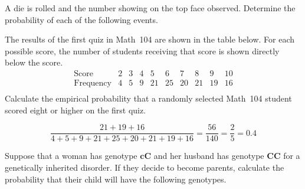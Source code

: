 \documentclass[addpoints,12pt]{exam}
\begin{document}
\begin{questions}

\question[15] A die is rolled and the number
showing on the top face observed. Determine the probability
of each of the following events.
\ifprintanswers\else\newpage\fi

\question[10] The results of the first quiz in Math~104 are
shown in the table below. For each possible score, the number
of students receiving that score is shown directly below
the score.
\[\begin{array}{c|cccccccccc}
\text{Score}&2&3&4&5&6&7&8&9&10\\\hline
\text{Frequency}&4&5&9&21&25&20&21&19&16\\
\end{array}\]
Calculate the empirical probability that a randomly
selected Math~104 student scored eight or higher
on the first quiz.
\begin{solution}[2in]
\[\frac{21+19+16}{4+5+9+21+25+20+21+19+16}
=\frac{56}{140}=\frac{2}{5}=0.4\]
\end{solution}

\question[15] Suppose that a woman has genotype $\mathbold{cC}$
and her husband has genotype $\mathbold{CC}$ for a
genetically inherited disorder.
If they decide to become parents, calculate the
probability that their child will
have the following genotypes.
\end{questions}
\end{document}
